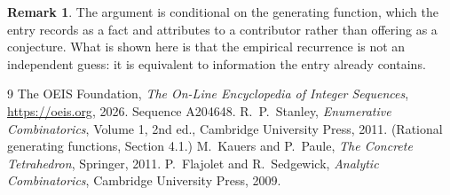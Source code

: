 \documentclass[11pt,a4paper]{article}
\theoremstyle{plain}
\theoremstyle{definition}
\newtheorem{remark}[theorem]{Remark}
\begin{document}
\begin{remark}
The argument is conditional on the generating function, which the entry records as a fact and
attributes to a contributor rather than offering as a conjecture. What is shown here is that
the empirical recurrence is not an independent guess: it is equivalent to information the
entry already contains.
\end{remark}

\begin{thebibliography}{9}
 The OEIS Foundation, \emph{The On-Line Encyclopedia of Integer
Sequences}, \url{https://oeis.org}, 2026. Sequence A204648.
 R.~P.~Stanley, \emph{Enumerative Combinatorics}, Volume 1, 2nd ed.,
Cambridge University Press, 2011. (Rational generating functions, Section 4.1.)
 M.~Kauers and P.~Paule, \emph{The Concrete Tetrahedron}, Springer, 2011.
 P.~Flajolet and R.~Sedgewick, \emph{Analytic Combinatorics}, Cambridge
University Press, 2009.
\end{thebibliography}
\end{document}
